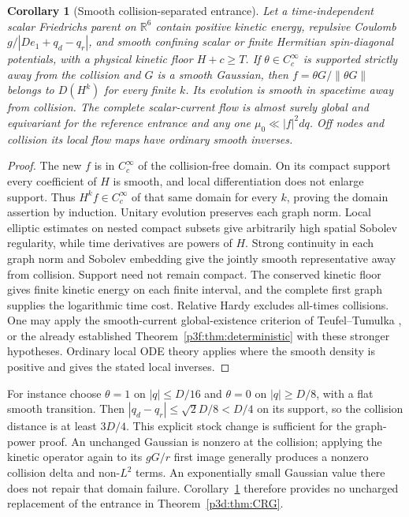 \documentclass[11pt]{article}
\numberwithin{equation}{section}
\newtheorem{corollary}[theorem]{Corollary}
\theoremstyle{definition}
\theoremstyle{remark}
\begin{document}
\begin{corollary}[Smooth collision-separated entrance]\label{p3d:cor:FR}
Let a time-independent scalar Friedrichs parent on $\mathbb R^6$
contain positive kinetic energy, repulsive Coulomb
$g/|De_1+q_d-q_r|$, and smooth confining scalar or finite Hermitian
spin-diagonal potentials, with a physical kinetic floor
$H+c\geq T$. If $\theta\in C_c^\infty$ is supported strictly away
from the collision and $G$ is a smooth Gaussian, then
$f=\theta G/\|\theta G\|$ belongs to $D(H^k)$ for every finite $k$.
Its evolution is smooth in spacetime away from collision.
The complete scalar-current flow is almost surely global and
equivariant for the reference entrance and any one
$\mu_0\ll|f|^2dq$. Off nodes and collision its local flow maps
have ordinary smooth inverses.
\end{corollary}
\begin{proof}
The new $f$ is in $C_c^\infty$ of the collision-free domain.
On its compact support every coefficient of $H$ is smooth, and
local differentiation does not enlarge support. Thus
$H^kf\in C_c^\infty$ of that same domain for every $k$, proving
the domain assertion by induction. Unitary evolution preserves
each graph norm. Local elliptic estimates on nested compact
subsets give arbitrarily high spatial Sobolev regularity, while
time derivatives are powers of $H$. Strong continuity in each
graph norm and Sobolev embedding give the jointly smooth
representative away from collision. Support need not remain compact.
The conserved kinetic floor gives finite kinetic energy on each
finite interval, and the complete first graph supplies the
logarithmic time cost. Relative Hardy excludes all-times collisions.
One may apply the smooth-current global-existence criterion
of Teufel--Tumulka \cite{TTflow}, or the already established
Theorem~\ref{p3f:thm:deterministic} with these stronger hypotheses.
Ordinary local ODE theory applies where the smooth density is
positive and gives the stated local inverses.
\end{proof}

For instance choose $\theta=1$ on $|q|\leq D/16$ and $\theta=0$
on $|q|\geq D/8$, with a flat smooth transition. Then
$|q_d-q_r|\leq\sqrt2D/8<D/4$ on its support, so the collision
distance is at least $3D/4$. This explicit stock change is sufficient
for the graph-power proof. An unchanged Gaussian is nonzero at the
collision; applying the kinetic operator again to its $gG/r$
first image generally produces a nonzero collision delta and
non-$L^2$ terms. An exponentially small Gaussian value there
does not repair that domain failure. Corollary~\ref{p3d:cor:FR}
therefore provides no uncharged replacement of the entrance
in Theorem~\ref{p3d:thm:CRG}.
\end{document}
